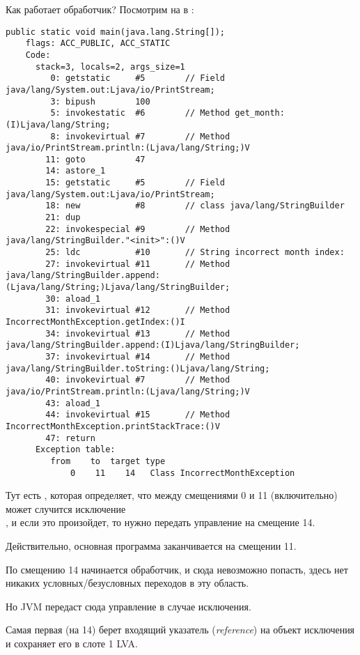 Как работает обработчик?
Посмотрим на \main в :

\begin{lstlisting}[caption=Month2.class]
  public static void main(java.lang.String[]);
    flags: ACC_PUBLIC, ACC_STATIC
    Code:
      stack=3, locals=2, args_size=1
         0: getstatic     #5        // Field java/lang/System.out:Ljava/io/PrintStream;
         3: bipush        100
         5: invokestatic  #6        // Method get_month:(I)Ljava/lang/String;
         8: invokevirtual #7        // Method java/io/PrintStream.println:(Ljava/lang/String;)V
        11: goto          47
        14: astore_1      
        15: getstatic     #5        // Field java/lang/System.out:Ljava/io/PrintStream;
        18: new           #8        // class java/lang/StringBuilder
        21: dup           
        22: invokespecial #9        // Method java/lang/StringBuilder."<init>":()V
        25: ldc           #10       // String incorrect month index: 
        27: invokevirtual #11       // Method java/lang/StringBuilder.append:(Ljava/lang/String;)Ljava/lang/StringBuilder;
        30: aload_1       
        31: invokevirtual #12       // Method IncorrectMonthException.getIndex:()I
        34: invokevirtual #13       // Method java/lang/StringBuilder.append:(I)Ljava/lang/StringBuilder;
        37: invokevirtual #14       // Method java/lang/StringBuilder.toString:()Ljava/lang/String;
        40: invokevirtual #7        // Method java/io/PrintStream.println:(Ljava/lang/String;)V
        43: aload_1       
        44: invokevirtual #15       // Method IncorrectMonthException.printStackTrace:()V
        47: return        
      Exception table:
         from    to  target type
             0    11    14   Class IncorrectMonthException
\end{lstlisting}

Тут есть , которая определяет, что между смещениями 0 и 11 (включительно)
может случится исключение \\
, и если это произойдет, то нужно передать
управление на смещение 14.

Действительно, основная программа заканчивается на смещении 11.

По смещению 14 начинается обработчик, и сюда невозможно попасть, 
здесь нет никаких условных/безусловных переходов в эту область.

Но \ac{JVM} передаст сюда управление в случае исключения.

Самая первая  (на 14) берет входящий указатель (\emph{reference}) на объект 
исключения и сохраняет его в слоте 1 \ac{LVA}.

